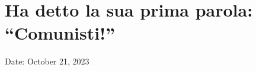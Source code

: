 \section{Ha detto la sua prima parola:
``Comunisti!''}\label{ha-detto-la-sua-prima-parola-comunisti}

Date: October 21, 2023
